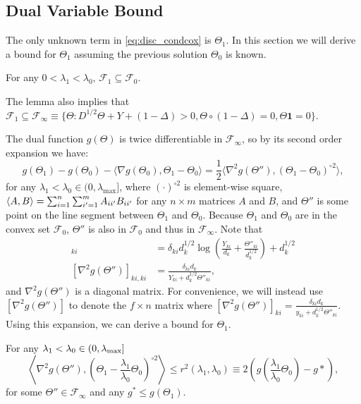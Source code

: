 \subsection{Dual Variable Bound}

The only unknown term in \eqref{eq:disc_condcox} is $\Theta_{1}$. In this section we will derive a bound for $\Theta_{1}$ assuming the previous solution $\Theta_{0}$ is known.

\begin{lemma}
    \label{lem:1}
    For any $0<\lambda_1<\lambda_0$, $\mathcal{F}_{1}\subseteq\mathcal{F}_{0}$.
\end{lemma}

The lemma also implies that $\mathcal{F}_{1}\subseteq\mathcal{F}_{\infty}\equiv\{\Theta: D^{1/2}\Theta+Y+(1-\Delta)> 0,\Theta\circ(1-\Delta)=0, \Theta\mathbf{1}=0\}$.

The dual function $g(\Theta)$ is twice differentiable in $\mathcal{F}_{\infty}$, so by its second order expansion we have:
\begin{equation}
        \label{eq:expand}
        g(\Theta_{1})-g(\Theta_{0})-\langle\nabla g(\Theta_{0}),\Theta_{1}-\Theta_{0}\rangle=\frac{1}{2}\langle\nabla^2 g(\Theta''),(\Theta_{1}-\Theta_{0})^{\circ 2}\rangle,%
\end{equation}
for any $\lambda_1<\lambda_{0}\in (0,\lambda_\textrm{max}]$, where $(\cdot)^{\circ2}$ is element-wise square, $\\\langle A,B\rangle=\sum_{i=1}^n\sum_{i'=1}^mA_{ii'}B_{ii'}$ for any $n\times m$ matrices $A$ and $B$, and $\Theta''$ is some point on the line segment between $\Theta_{1}$ and $\Theta_{0}$. Because $\Theta_{1}$ and $\Theta_{0}$ are in the convex set $\mathcal{F}_{0}$, $\Theta''$ is also in $\mathcal{F}_{0}$ and thus in $\mathcal{F}_{\infty}$. Note that
\begin{align*}
  [\nabla g(\Theta'')]_{ki} &= \delta_{ki}d_k^{1/2}\log\left(\frac{Y_{ki}}{d_k}+\frac{\Theta''_{ki}}{d_k^{1/2}}\right)+d_k^{1/2} \\
  [\nabla^2 g(\Theta'')]_{ki,ki} &= \frac{\delta_{ki}d_k}{Y_{ki}+d_k^{1/2}\Theta''_{ki}},
\end{align*}
and $\nabla^2 g(\Theta'')$ is a diagonal matrix. For convenience, we will instead use $[\nabla^2 g(\Theta'')]$ to denote the $f\times n$ matrix where $[\nabla^2 g(\Theta'')]_{ki}=\frac{\delta_{ki}d_k}{y_{ki}+d_k^{1/2}\Theta''_{ki}}$. Using this expansion, we can derive a bound for $\Theta_{1}$.
\begin{theorem}
    \label{thm:1}
    For any $\lambda_1<\lambda_{0}\in (0,\lambda_\textnormal{max}]$ 
    \begin{equation}
        \left\langle\nabla^2 g(\Theta''),\left(\Theta_{1}-\frac{\lambda_1}{\lambda_0}\Theta_{0}\right)^{\circ 2}\right\rangle\leq r^2(\lambda_1,\lambda_0)\equiv 2\left(g\left(\frac{\lambda_1}{\lambda_0}\Theta_{0}\right)-g*\right),
    \end{equation}
    for some $\Theta''\in\mathcal{F}_{\infty}$ and any $g^*\leq g(\Theta_{1})$.
\end{theorem}

